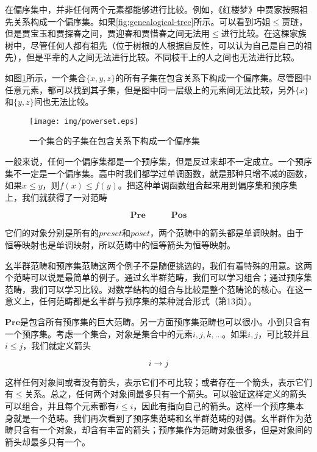 \documentclass{article}
\begin{document}
在偏序集中，并非任何两个元素都能够进行比较。例如，《红楼梦》中贾家按照祖先关系构成一个偏序集。如果\ref{fig:genealogical-tree}所示。可以看到巧姐$\leq$贾琏，但是贾宝玉和贾探春之间，贾迎春和贾惜春之间无法用$\leq$进行比较。在这棵家族树中，尽管任何人都有祖先（位于树根的人根据自反性，可以认为自己是自己的祖先），但是平辈的人之间无法进行比较。不同枝干上的人之间也无法进行比较。

如图\ref{fig:powerset}所示，一个集合$\{x, y, z\}$的所有子集在包含关系下构成一个偏序集。尽管图中任意元素，都可以找到其子集，但是图中同一层级上的元素间无法比较，另外$\{x\}$和$\{y, z\}$间也无法比较。

\begin{figure}[htbp]
 \centering
 \texttt{[image: img/powerset.eps]}
 \caption{一个集合的子集在包含关系下构成一个偏序集}
 \label{fig:powerset}
\end{figure}

一般来说，任何一个偏序集都是一个预序集，但是反过来却不一定成立。一个预序集不一定是一个偏序集。高中时我们都学过单调函数，就是那种只增不减的函数，如果$x \leq y$，则$f(x) \leq f(y)$。把这种单调函数组合起来用到偏序集和预序集上，我们就获得了一对范畴

\[
\pmb{Pre} \quad \quad \quad \pmb{Pos}
\]

它们的对象分别是所有的$preset$和$poset$，两个范畴中的箭头都是单调映射。由于恒等映射也是单调映射，所以范畴中的恒等箭头为恒等映射。

幺半群范畴和预序集范畴这两个例子不是随便挑选的，我们有着特殊的用意。这两个范畴可以说是最简单的例子。通过幺半群范畴，我们可以学习组合；通过预序集范畴，我们可以学习比较。对数学结构的组合与比较是整个范畴论的核心。在这一意义上，任何范畴都是幺半群与预序集的某种混合形式（\cite{Simmons2011}第13页）。

$\pmb{Pre}$是包含所有预序集的巨大范畴。另一方面预序集范畴也可以很小。小到只含有一个预序集。考虑一个集合，对象是集合中的元素$i, j, k, ...$。如果$i, j$，可比较并且$i \leq j$，我们就定义箭头

\[
i \longrightarrow j
\]

这样任何对象间或者没有箭头，表示它们不可比较；或者存在一个箭头，表示它们有$\leq$关系。总之，任何两个对象间最多只有一个箭头。可以验证这样定义的箭头可以组合，并且每个元素都有$i \leq i$，因此有指向自己的箭头。这样一个预序集本身就是一个范畴。我们再次看到了预序集范畴和幺半群范畴的对偶。幺半群作为范畴只含有一个对象，却含有丰富的箭头；预序集作为范畴对象很多，但是对象间的箭头却最多只有一个。
\end{document}

